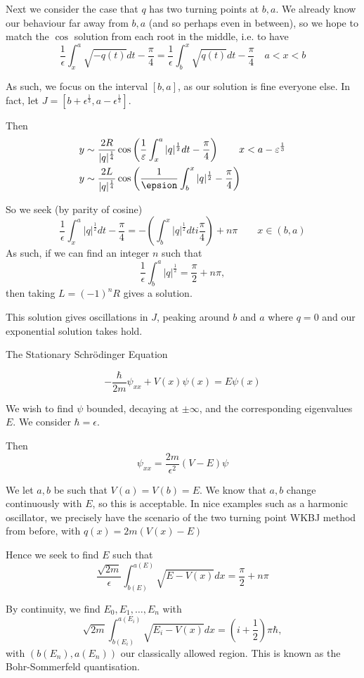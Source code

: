 \documentclass[a4paper]{article}
\begin{document}
\vspace{1em}

Next we consider the case that $q$ has two turning points at $b, a$. We already know our behaviour far away from  $b, a$ (and so perhaps even in between), so we hope to match the $\cos$ solution from each root in the middle, i.e. to have
\[
	\frac{1}{\epsilon} \int_{x}^{a} \sqrt{-q(t)} dt - \frac{\pi}{4} = \frac{1}{\epsilon} \int_{b}^{x} \sqrt{q(t)}  dt - \frac{\pi}{4} \quad a < x < b
\]

As such, we focus on the interval $[b,a]$, as our solution is fine everyone else. In fact, let  $J = [b+\epsilon^{\frac{1}{3}}, a-\epsilon^{\frac{1}{3}}]$.

Then
\begin{align*}
	y &\sim \frac{2R}{|q|^{\frac{1}{4}}} \cos\left( \frac{1}{\epsilon} \int_x^{a} |q|^{\frac{1}{2}}dt - \frac{\pi}{4} \right) \qquad x < a - \epsilon^{\frac{1}{3}} \\
	y &\sim \frac{2L}{|q|^{\frac{1}{4}}} \cos\left( \frac{1}{\epsion}\int_b^{x} |q|^{\frac{1}{2}} - \frac{\pi}{4} \right) 
\end{align*}

So we seek (by parity of cosine)
\[
	\frac{1}{\epsilon} \int_{x}^{a}|q|^{\frac{1}{2}} dt - \frac{\pi}{4} = - \left(\int_{b}^{x} |q|^{\frac{1}{2}} dt i \frac{\pi}{4}\right) + n\pi \qquad x \in (b,a)
\] 
As such, if we can find an integer $n$ such that
\[
\frac{1}{\epsilon} \int_b^{a} |q|^{\frac{1}{2}} = \frac{\pi}{2} + n\pi
,\] then taking $L = (-1)^{n}R$ gives a solution.

This solution gives oscillations in $J$, peaking around $b$ and $a$ where $q = 0$ and our exponential solution takes hold.

\begin{eg} The Stationary Schr\"{o}dinger Equation
	
\[
	- \frac{\hbar}{2m} \psi_{x x } + V(x)\psi(x) = E\psi(x)
\] 

We wish to find $\psi$ bounded, decaying at $\pm \infty$, and the corresponding eigenvalues $E$. We consider $\hbar = \epsilon$.

Then
\[
	\psi_{x x} = \frac{2m}{\epsilon^2} (V-E)\psi
\] 

We let $a, b$ be such that $V(a) = V(b) = E$. We know that  $a, b$ change continuously with $E$, so this is acceptable. In nice examples such as a harmonic oscillator, we precisely have the scenario of the two turning point WKBJ method from before, with  $q(x) = 2m(V(x) - E)$

Hence we seek to find  $E$ such that
\[
	\frac{\sqrt{2m} }{\epsilon} \int_{b(E)}^{a(E)} \sqrt{E -V(x)} dx = \frac{\pi}{2}  + n\pi
\] 

By continuity, we find $E_0, E_1, \ldots, E_n$ with
\[
	\sqrt{2m}\int_{b(E_i)}^{a(E_i)} \sqrt{E_i - V(x)} dx = (i +\frac{1}{2})\pi \hbar
,\] with $\left(b(E_n), a(E_n)\right)$ our classically allowed region.
This is known as the Bohr-Sommerfeld quantisation. 
\end{eg}
\end{document}
